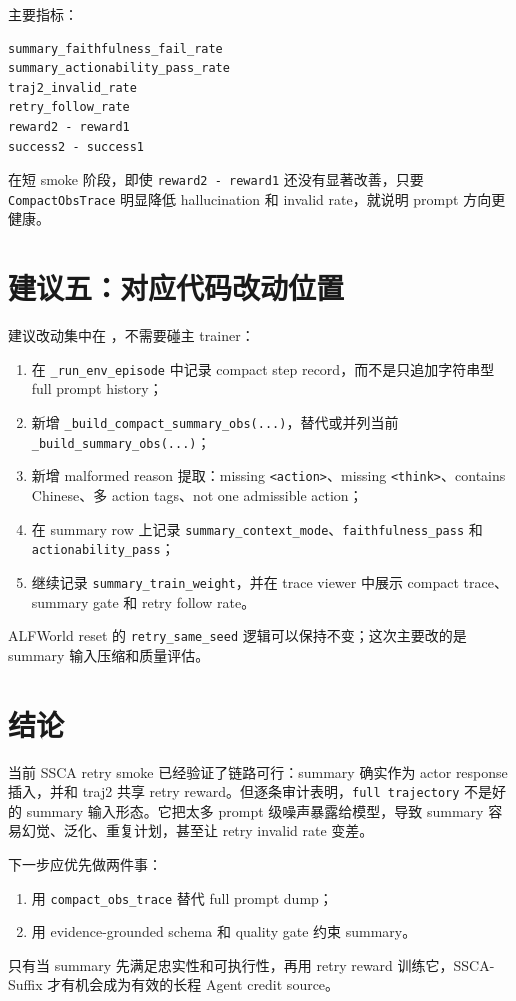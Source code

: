 \documentclass[10pt]{ctexart}
\begin{document}
主要指标：
\begin{lstlisting}
summary_faithfulness_fail_rate
summary_actionability_pass_rate
traj2_invalid_rate
retry_follow_rate
reward2 - reward1
success2 - success1
\end{lstlisting}

在短 smoke 阶段，即使 \texttt{reward2 - reward1} 还没有显著改善，只要 \texttt{CompactObsTrace} 明显降低 hallucination 和 invalid rate，就说明 prompt 方向更健康。

\section{建议五：对应代码改动位置}
建议改动集中在 ，不需要碰主 trainer：
\begin{enumerate}
  \item 在 \texttt{\_run\_env\_episode} 中记录 compact step record，而不是只追加字符串型 full prompt history；
  \item 新增 \texttt{\_build\_compact\_summary\_obs(...)}，替代或并列当前 \texttt{\_build\_summary\_obs(...)}；
  \item 新增 malformed reason 提取：missing \texttt{<action>}、missing \texttt{<think>}、contains Chinese、多 action tags、not one admissible action；
  \item 在 summary row 上记录 \texttt{summary\_context\_mode}、\texttt{faithfulness\_pass} 和 \texttt{actionability\_pass}；
  \item 继续记录 \texttt{summary\_train\_weight}，并在 trace viewer 中展示 compact trace、summary gate 和 retry follow rate。
\end{enumerate}

ALFWorld reset 的 \texttt{retry\_same\_seed} 逻辑可以保持不变；这次主要改的是 summary 输入压缩和质量评估。

\section{结论}
当前 SSCA retry smoke 已经验证了链路可行：summary 确实作为 actor response 插入，并和 traj2 共享 retry reward。但逐条审计表明，\texttt{full trajectory} 不是好的 summary 输入形态。它把太多 prompt 级噪声暴露给模型，导致 summary 容易幻觉、泛化、重复计划，甚至让 retry invalid rate 变差。

下一步应优先做两件事：
\begin{enumerate}
  \item 用 \texttt{compact\_obs\_trace} 替代 full prompt dump；
  \item 用 evidence-grounded schema 和 quality gate 约束 summary。
\end{enumerate}

只有当 summary 先满足忠实性和可执行性，再用 retry reward 训练它，SSCA-Suffix 才有机会成为有效的长程 Agent credit source。
\end{document}
